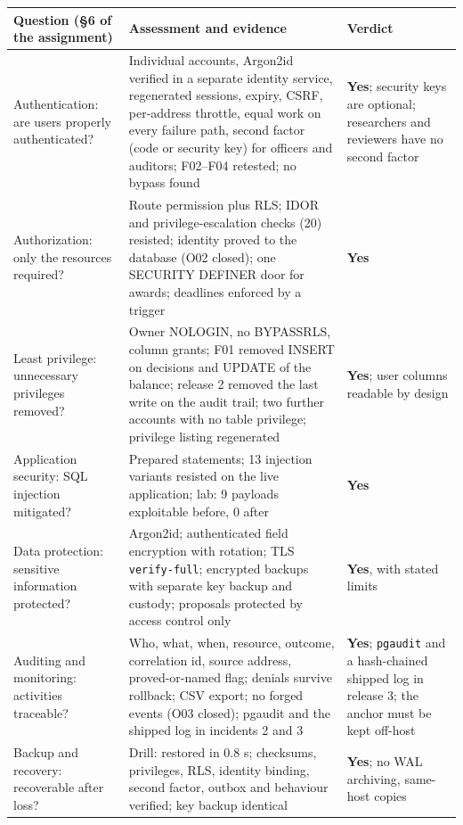 \documentclass[10pt,a4paper]{article}
\newcommand{\code}[1]{\nolinkurl{#1}}
\newcommand{\resisted}[1]{\textcolor{okgreen}{\textbf{#1}}}
\begin{document}
\begin{center}\small
\begin{tabularx}{\linewidth}{@{}L{2.9cm}YL{2.5cm}@{}}
\toprule\textbf{Question (\S6 of the assignment)} & \textbf{Assessment and evidence} & \textbf{Verdict}\\\midrule
Authentication: are users properly authenticated? & Individual accounts, Argon2id verified in a separate identity service, regenerated sessions, expiry, CSRF, per-address throttle, equal work on every failure path, second factor (code or security key) for officers and auditors; F02--F04 retested; no bypass found & \resisted{Yes}; security keys are optional; researchers and reviewers have no second factor\\
Authorization: only the resources required? & Route permission plus RLS; IDOR and privilege-escalation checks (20) resisted; identity proved to the database (O02 closed); one SECURITY DEFINER door for awards; deadlines enforced by a trigger & \resisted{Yes}\\
Least privilege: unnecessary privileges removed? & Owner NOLOGIN, no BYPASSRLS, column grants; F01 removed INSERT on decisions and UPDATE of the balance; release 2 removed the last write on the audit trail; two further accounts with no table privilege; privilege listing regenerated & \resisted{Yes}; user columns readable by design\\
Application security: SQL injection mitigated? & Prepared statements; 13 injection variants resisted on the live application; lab: 9 payloads exploitable before, 0 after & \resisted{Yes}\\
Data protection: sensitive information protected? & Argon2id; authenticated field encryption with rotation; TLS \code{verify-full}; encrypted backups with separate key backup and custody; proposals protected by access control only & \resisted{Yes}, with stated limits\\
Auditing and monitoring: activities traceable? & Who, what, when, resource, outcome, correlation id, source address, proved-or-named flag; denials survive rollback; CSV export; no forged events (O03 closed); pgaudit and the shipped log in incidents 2 and 3 & \resisted{Yes}; \code{pgaudit} and a hash-chained shipped log in release 3; the anchor must be kept off-host\\
Backup and recovery: recoverable after loss? & Drill: restored in 0.8 s; checksums, privileges, RLS, identity binding, second factor, outbox and behaviour verified; key backup identical & \resisted{Yes}; no WAL archiving, same-host copies\\

\end{tabularx}
\end{center}
\end{document}
